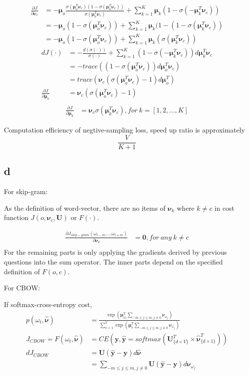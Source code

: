 \documentclass[11pt, oneside]{article}   	%
\begin{document}
\begin{align}
\frac{\partial J}{\partial \bm{\nu}_c} &= -\bm\mu_o\frac{\sigma(\bm{\mu}_o^T\bm\nu_c)(1-\sigma(\bm{\mu}_o^T\bm\nu_c))}{\sigma(\bm{\mu}_o^T\bm\nu_c)} + \sum_{k = 1}^K \bm\mu_k(1 - \sigma(-\bm\mu_k^T\bm\nu_c))\\
&= -\bm\mu_o(1-\sigma(\bm{\mu}_o^T\bm\nu_c)) + \sum_{k = 1}^K \bm\mu_k(1 - (1-\sigma(\bm\mu_k^T\bm\nu_c))\\
&= -\bm\mu_o(1-\sigma(\bm{\mu}_o^T\bm\nu_c)) +\sum_{k = 1}^K \bm\mu_k(\sigma(\bm\mu_k^T\bm\nu_c))
\end{align}
\begin{align}
d J(\cdot) &= - \frac{d(\sigma(\cdot))}{\sigma(\cdot)} +\sum_{k = 1}^{K}(1 - \sigma(-\bm\mu_k^T\bm\nu_c))d\bm\mu_k^T\bm\nu_c\\
&=- trace({(1-\sigma(\bm\mu_o^T \bm\nu_c)) d \bm\mu_o^T \bm\nu_c}) \\
&= trace(\bm\nu_c(\sigma(\bm\mu_o^T \bm\nu_c)-1)d \bm\mu_o^T)\\
\frac{\partial J}{\partial \bm{\mu}_o} &= \bm\nu_c(\sigma(\bm\mu_o^T \bm\nu_c)-1)\\
\end{align}
\begin{align}
\frac{\partial J}{\partial \bm{\mu}_k} &= \bm\nu_c\sigma(\bm\mu_k^T\bm\nu_c), for~k = [1, 2, ..., K]
\end{align}

Computation efficiency of negtive-sampling loss, speed up ratio is approximately
$$\frac{V}{K+1}$$

\subsection{d}
For skip-gram: 

As the definition of word-vector, there are no items of $\bm\nu_k$ where $k \neq c$ in cost function $J(o, \bm\nu_c, \bm{U})$ or $F(\cdot)$.

\begin{align}
\frac{\partial J_{skip-gram}(\omega_{t-m},...\omega_{t+m})}{\partial \bm\nu_k} &= \bm{0}, for~any~k\neq c\\
\end{align}
For the remaining parts is only applying the gradients derived by previous questions into the sum operator. The inner parts depend on the specified definition of $F(o, c)$.

For CBOW:

If softmax-cross-entropy cost, 
\begin{align}
p(\omega_t, \hat{\bm{\nu}}) &= \frac{\exp(\bm\mu_{\omega_t}^T \sum_{-m\leq j\leq m, j\neq 0}\bm\nu_{\omega_j})}{\sum_{v = 1}^V\exp(\bm\mu_v^T \sum_{-m\leq j\leq m, j\neq 0}\bm\nu_{\omega_j})}\\
J_{CBOW} = F(\omega_t, \hat{\bm{\nu}}) &= CE(\bm{y}, \hat{\bm{y}} = softmax(\bm{U}_{\{d\times V\}}^T \times \hat{\bm{\nu}}_{\{d\times 1\}}^T))\\
d J_{CBOW} &= \bm{U}(\hat{\bm{y}} - \bm{y}) d \hat{\bm{\nu}}\\
&= \sum_{-m\leq j\leq m, j\neq 0} \bm{U}(\hat{\bm{y}} - \bm{y}) d \bm\nu_{\omega_j}
\end{align}
\end{document}
